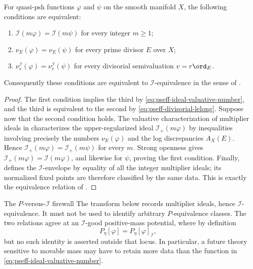 \begin{proposition}\label{prop:pseff-i-equivalence-valuative}
For quasi-psh functions $\varphi$ and $\psi$ on the smooth manifold
$X$, the following conditions are equivalent:
\begin{enumerate}
\item $\mathcal I(m\varphi)=\mathcal I(m\psi)$ for every integer
      $m\geq1$;
\item $\nu_E(\varphi)=\nu_E(\psi)$ for every prime divisor $E$
      over $X$;
\item $\nu_v^{\mathcal I}(\varphi)=\nu_v^{\mathcal I}(\psi)$ for
      every divisorial semivaluation $v=r\ord_E$.
\end{enumerate}
Consequently these conditions are equivalent to
$\mathcal I$-equivalence in the sense of
\cite[Definition~2.7]{Xia23Operations}.
\end{proposition}

\begin{proof}
The first condition implies the third by
\eqref{eq:pseff-ideal-valuative-number}, and the third is equivalent to
the second by \eqref{eq:pseff-divisorial-lelong}.  Suppose now that the
second condition holds.  The valuative characterization of multiplier
ideals in \cite[Theorem~A]{BFJ08} characterizes the upper-regularized
ideal $\mathcal I_+(m\varphi)$ by inequalities involving precisely the
numbers $\nu_E(\varphi)$ and the log discrepancies $A_X(E)$.
Hence
$\mathcal I_+(m\varphi)=\mathcal I_+(m\psi)$ for every $m$.
Strong openness \cite{GZ15} gives
$\mathcal I_+(m\varphi)=\mathcal I(m\varphi)$, and likewise for
$\psi$, proving the first condition.  Finally,
\cite[Definition~2.3]{Xia23Operations} defines the
$\mathcal I$-envelope by equality of all the integer multiplier ideals;
its normalized fixed points are therefore classified by the same data.
This is exactly the equivalence relation of
\cite[Definition~2.7]{Xia23Operations}.
\end{proof}

\begin{warning}{The $P$-versus-$\mathcal I$ firewall}
\label{warn:pseff-p-i-firewall}
The transform below records multiplier ideals, hence
$\mathcal I$-equivalence.  It must not be used to identify arbitrary
$P$-equivalence classes.  The two relations agree at an
$\mathcal I$-good positive-mass potential, where by definition
\[
                  P_\eta[\varphi]
                  =P_\eta[\varphi]_{\mathcal I},
\tag{71.11}\label{eq:pseff-i-good-firewall}
\]
but no such identity is asserted outside that locus.  In particular, a
future theory sensitive to movable mass may have to retain more data than
the function in \eqref{eq:pseff-ideal-valuative-number}.
\end{warning}


